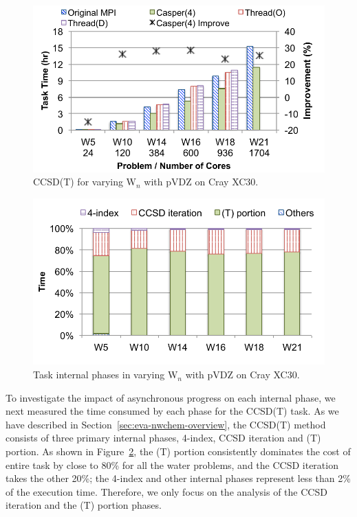 \begin{figure}
\centering
\includegraphics[width=0.8\columnwidth]{figures/adpt-casper/eva_edison_nw_wn_ccsd_t_task_weak.pdf}
\caption{CCSD(T) for varying W$_n$ with pVDZ on Cray XC30.}
\label{fig:eva-edison-nw-ccsdt-wN}
\end{figure}

\begin{figure}
\centering
\includegraphics[width=0.8\columnwidth]{figures/adpt-casper/eva_edison_nw_wn_ccsd_t_steps_weak.pdf}
\caption{Task internal phases in varying W$_n$ with pVDZ on Cray XC30.}
\label{fig:eva-edison-nw-ccsdt-wN-pf}
\end{figure}

To investigate the impact of asynchronous progress on each internal
phase, we next measured the time consumed by each phase for the CCSD(T)
task. As we have described in Section~\ref{sec:eva-nwchem-overview}, the
CCSD(T) method consists of three primary internal phases, 4-index, CCSD
iteration and (T) portion. As shown in Figure~\ref{fig:eva-edison-nw-ccsdt-wN-pf},
the (T) portion consistently dominates the cost of entire task by close
to 80\% for all the water problems, and the CCSD iteration takes the
other 20\%; the 4-index and other internal phases represent less than
2\% of the execution time. Therefore, we only focus on the analysis of
the CCSD iteration and the (T) portion phases.

